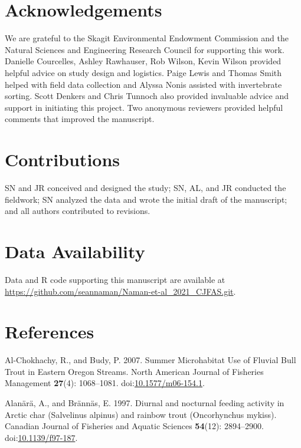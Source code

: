 \documentclass[]{article}
\begin{document}
\section{Acknowledgements}\label{acknowledgements}

We are grateful to the Skagit Environmental Endowment Commission and the
Natural Sciences and Engineering Research Council for supporting this
work. Danielle Courcelles, Ashley Rawhauser, Rob Wilson, Kevin Wilson
provided helpful advice on study design and logistics. Paige Lewis and
Thomas Smith helped with field data collection and Alyssa Nonis assisted
with invertebrate sorting. Scott Denkers and Chris Tunnoch also provided
invaluable advice and support in initiating this project. Two anonymous
reviewers provided helpful comments that improved the manuscript.

\section{Contributions}\label{contributions}

SN and JR conceived and designed the study; SN, AL, and JR conducted the
fieldwork; SN analyzed the data and wrote the initial draft of the
manuscript; and all authors contributed to revisions.

\section{Data Availability}\label{data-availability}

Data and R code supporting this manuscript are available at
\url{https://github.com/seannaman/Naman-et-al_2021_CJFAS.git}.

\section{References}\label{references}

\hypertarget{refs}{}
\hypertarget{ref-Al-Chokhachy2007a}{}
Al-Chokhachy, R., and Budy, P. 2007. Summer Microhabitat Use of Fluvial
Bull Trout in Eastern Oregon Streams. North American Journal of
Fisheries Management \textbf{27}(4): 1068--1081.
doi:\href{https://doi.org/10.1577/m06-154.1}{10.1577/m06-154.1}.

\hypertarget{ref-Alanara1997}{}
Alanärä, A., and Brännäs, E. 1997. Diurnal and nocturnal feeding
activity in Arctic char (Salvelinus alpinus) and rainbow trout
(Oncorhynchus mykiss). Canadian Journal of Fisheries and Aquatic
Sciences \textbf{54}(12): 2894--2900.
doi:\href{https://doi.org/10.1139/f97-187}{10.1139/f97-187}.
\end{document}
